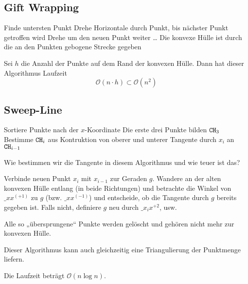 \documentclass[11pt]{scrartcl}
\renewcommand{\O}{\mathcal{O}}
\begin{document}
\subsection{Gift Wrapping}

\begin{alg}
	\begin{algorithmic}
		\State Finde untersten Punkt
		\State Drehe Horizontale durch Punkt, bis nächster Punkt getroffen wird
		\State Drehe um den neuen Punkt weiter
		\State \dots
		\State Die konvexe Hülle ist durch die an den Punkten gebogene Strecke gegeben
	\end{algorithmic}
	Sei $h$ die Anzahl der Punkte auf dem Rand der konvexen Hülle.
	Dann hat dieser Algorithmus Laufzeit
	\[
		\O(n\cdot h) \subset \O(n^2)
	\]
\end{alg}

\subsection{Sweep-Line}

\begin{alg}
	\begin{algorithmic}
		\State Sortiere Punkte nach der $x$-Koordinate
		\State Die erste drei Punkte bilden $\texttt{CH}_3$
		\For{$i=4,\dotsc,n$}
			\State Bestimme $\texttt{CH}_i$ aus Kontruktion von oberer und unterer Tangente durch $x_i$ an $\texttt{CH}_{i-1}$
		\EndFor
	\end{algorithmic}
\end{alg}

Wie bestimmen wir die Tangente in diesem Algorithmus und wie teuer ist das?

Verbinde neuen Punkt $x_i$ mit $x_{i-1}$ zur Geraden $g$.
Wandere an der alten konvexen Hülle entlang (in beide Richtungen) und betrachte die Winkel von $\_{xx^{(+1)}}$ zu $g$ (bzw. $\_{xx^{(-1)}}$) und entscheide, ob die Tangente durch $g$ bereits gegeben ist.
Falls nicht, definiere $g$ neu durch $\_{x_ix^{+2}}$, usw.

Alle so „übersprungene“ Punkte werden gelöscht und gehören nicht mehr zur konvexen Hülle.


\begin{note}
	Dieser Algorithmus kann auch gleichzeitig eine Triangulierung der Punktmenge liefern.
\end{note}

Die Laufzeit beträgt $\O(n\log n)$.
\end{document}
